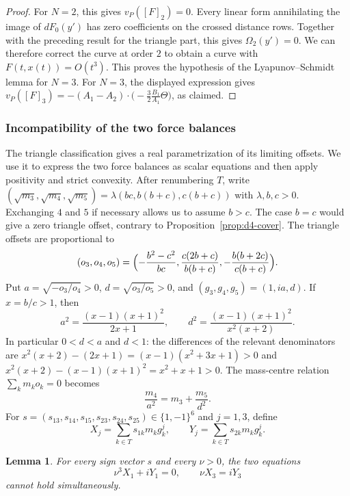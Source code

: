 \documentclass[Threeside,11pt]{article}
\newtheorem{lemma}[theorem]{Lemma}
\theoremstyle{definition}
\theoremstyle{remark}
\numberwithin{equation}{section}
\theoremstyle{remark}
\begin{document}
\begin{proof}
{For $N=2$, this gives $v_P([F]_2)=0$.
Every linear form annihilating the image of $dF_0(y')$ has zero coefficients on the
crossed distance rows. Together with the preceding result for the triangle part,
this gives $\Omega_2(y')=0$. We can therefore correct the curve at order $2$ to obtain}
{a curve with $F(t,x(t))=O(t^3)$.
This proves the hypothesis of the Lyapunov--Schmidt lemma for $N=3$.
For $N=3$, the displayed expression gives
$v_P([F]_3)=-(A_1-A_2)\cdot\big(-\frac32\frac{B_1}{A_1}\Theta\big)$, as claimed.}
\end{proof}

{\subsubsection{Incompatibility of the two force balances}\label{d4-census}
The triangle classification gives a real parametrization of its limiting offsets.
We use it to express the two force balances as scalar equations and then apply
positivity and strict convexity.
After renumbering $T$, write
$(\sqrt{m_3},\sqrt{m_4},\sqrt{m_5})=\lambda(bc,b(b+c),c(b+c))$
with $\lambda,b,c>0$. Exchanging $4$ and $5$ if necessary allows us to assume
$b>c$. The case $b=c$ would give a zero triangle offset, contrary to
Proposition~\ref{prop:d4-cover}. The triangle offsets are proportional to
\[
 (o_3,o_4,o_5)=\Bigl(-\frac{b^2-c^2}{bc},
 \frac{c(2b+c)}{b(b+c)},-\frac{b(b+2c)}{c(b+c)}\Bigr).
\]
Put $a=\sqrt{-o_3/o_4}>0$, $d=\sqrt{o_3/o_5}>0$, and
$(g_3,g_4,g_5)=(1,ia,d)$.  If $x=b/c>1$, then
\[
 a^2=\frac{(x-1)(x+1)^2}{2x+1},\qquad
 d^2=\frac{(x-1)(x+1)^2}{x^2(x+2)}.
\]
In particular $0<d<a$ and $d<1$: the differences of the relevant
denominators are
$x^2(x+2)-(2x+1)=(x-1)(x^2+3x+1)>0$ and
$x^2(x+2)-(x-1)(x+1)^2=x^2+x+1>0$.
The mass-centre relation $\sum_km_ko_k=0$ becomes
\begin{equation}\label{eq:d4-positive-centre}
 \frac{m_4}{a^2}=m_3+\frac{m_5}{d^2}.
\end{equation}
For $s=(s_{13},s_{14},s_{15},s_{23},s_{24},s_{25})\in\{1,-1\}^6$
and $j=1,3$, define
\[
 X_j=\sum_{k\in T}s_{1k}m_kg_k^j,\qquad
 Y_j=\sum_{k\in T}s_{2k}m_kg_k^j.
\]

\begin{lemma}\label{lem:d4-census}
For every sign vector $s$ and every $\nu>0$, the two equations
\[
 \nu^3X_1+iY_1=0,\qquad \nu X_3=iY_3
\]
cannot hold simultaneously.
\end{lemma}

}
\end{document}
